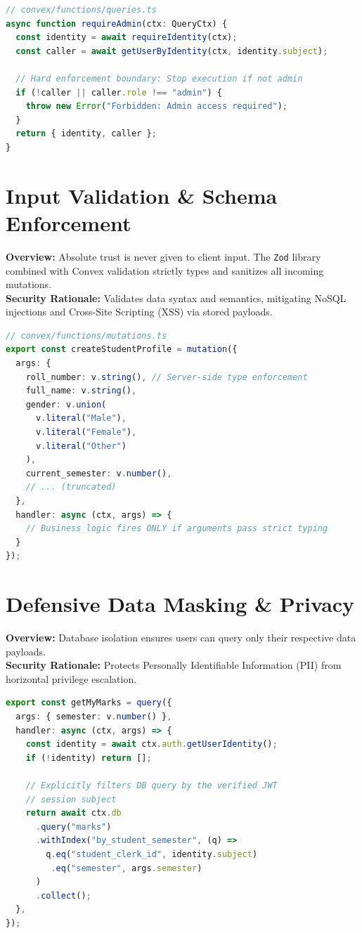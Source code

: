 \documentclass[12pt,a4paper]{report}
\begin{document}
\begin{lstlisting}[language=TypeScript, caption={Enforcing RBAC inside Convex Queries}, label={lst:rbac}]
// convex/functions/queries.ts
async function requireAdmin(ctx: QueryCtx) {
  const identity = await requireIdentity(ctx);
  const caller = await getUserByIdentity(ctx, identity.subject);
  
  // Hard enforcement boundary: Stop execution if not admin
  if (!caller || caller.role !== "admin") {
    throw new Error("Forbidden: Admin access required");
  }
  return { identity, caller };
}
\end{lstlisting}

\section{Input Validation \& Schema Enforcement}
\textbf{Overview:} Absolute trust is never given to client input. The \texttt{Zod} library combined with Convex validation strictly types and sanitizes all incoming mutations. \\
\textbf{Security Rationale:} Validates data syntax and semantics, mitigating NoSQL injections and Cross-Site Scripting (XSS) via stored payloads.

\begin{lstlisting}[language=TypeScript, caption={Strict Payload Validation}, label={lst:zod}]
// convex/functions/mutations.ts
export const createStudentProfile = mutation({
  args: {
    roll_number: v.string(), // Server-side type enforcement
    full_name: v.string(),
    gender: v.union(
      v.literal("Male"), 
      v.literal("Female"), 
      v.literal("Other")
    ),
    current_semester: v.number(),
    // ... (truncated)
  },
  handler: async (ctx, args) => {
    // Business logic fires ONLY if arguments pass strict typing
  }
});
\end{lstlisting}

\section{Defensive Data Masking \& Privacy}
\textbf{Overview:} Database isolation ensures users can query only their respective data payloads. \\
\textbf{Security Rationale:} Protects Personally Identifiable Information (PII) from horizontal privilege escalation.
\begin{lstlisting}[language=TypeScript, caption={Restricting Data Visibility (IDOR Prevention)}, label={lst:privacy}]
export const getMyMarks = query({
  args: { semester: v.number() },
  handler: async (ctx, args) => {
    const identity = await ctx.auth.getUserIdentity();
    if (!identity) return [];
    
    // Explicitly filters DB query by the verified JWT 
    // session subject
    return await ctx.db
      .query("marks")
      .withIndex("by_student_semester", (q) =>
        q.eq("student_clerk_id", identity.subject)
         .eq("semester", args.semester)
      )
      .collect();
  },
});
\end{lstlisting}
\end{document}
